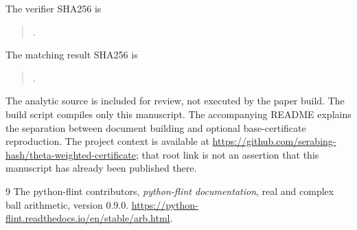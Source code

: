 \documentclass[11pt]{article}
\begin{document}
The verifier SHA256 is
\begin{quote}\small{}.\end{quote}
The matching result SHA256 is
\begin{quote}\small{}.\end{quote}
The analytic source is included for review, not executed by the paper
build. The build script compiles only this manuscript. The accompanying
README explains the separation between document building and optional
base-certificate reproduction. The project context is available at
\url{https://github.com/serabing-hash/theta-weighted-certificate}; that
root link is not an assertion that this manuscript has already been
published there.

\begin{thebibliography}{9}
 The python-flint contributors,
\emph{python-flint documentation}, real and complex ball arithmetic,
version 0.9.0.
\url{https://python-flint.readthedocs.io/en/stable/arb.html}.
\end{thebibliography}
\end{document}
